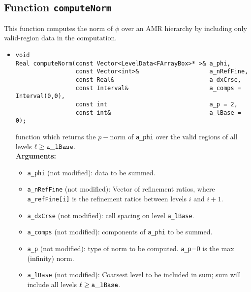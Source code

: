 \subsection{Function {\tt computeNorm}}

This function computes the norm of $\phi$ over an AMR
hierarchy by including only valid-region data in the computation.

\begin{itemize}

\item
\begin{verbatim}
void
Real computeNorm(const Vector<LevelData<FArrayBox>* >& a_phi,
                 const Vector<int>&                    a_nRefFine,
                 const Real&                           a_dxCrse,
                 const Interval&                       a_comps = Interval(0,0),
                 const int                             a_p = 2,
                 const int&                            a_lBase = 0);
\end{verbatim}
function which returns the $p-$norm of \verb/a_phi/ over
the valid regions of all levels $\ell \geq \tt{a\_lBase}$.
\\ {\bf Arguments:}
  \begin{itemize}
  \item
  \verb|a_phi| (not modified): data to be summed.
  \item
  \verb|a_nRefFine| (not modified): Vector of refinement ratios, where
  \verb/a_refFine[i]/ is the refinement ratios between levels $i$ and
  $i+1$. 
  \item
  \verb|a_dxCrse| (not modified): cell spacing on level \verb/a_lBase/.
  \item
  \verb|a_comps| (not modified): components of \verb/a_phi/ to be
  summed.
  \item
  \verb/a_p/ (not modified): type of norm to be computed. \verb/a_p/=0
  is the max (infinity) norm.
  \item
  \verb|a_lBase| (not modified): Coarsest level to be included in sum;
  sum will include all levels $\ell \geq \tt{a\_lBase}$. 

  \end{itemize}

\end{itemize}
